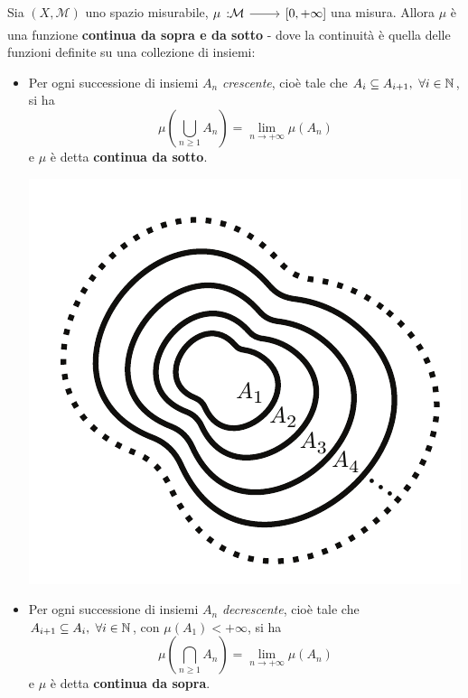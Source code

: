 \begin{property}
	Sia $\left(X,\mathcal{M}\right)$ uno spazio misurabile, $\funz{\mu}{\mathcal{M}}{\left[0,+\infty\right]}$ una misura. Allora $\mu$ è una funzione \textbf{continua da sopra e da sotto} - dove la continuità è quella delle funzioni definite su una collezione di insiemi:
	\begin{itemize}
		\item Per ogni successione di insiemi $A_n$ \textit{crescente}, cioè tale che $A_i\subseteq A_{i+1},\ \forall i\in\mathbb{N}$, si ha
		\begin{equation}
			\mu\left(\bigcup_{n\geq 1}A_n\right)=\lim_{n\to+\infty}\mu\left(A_n\right)
		\end{equation}
		e $\mu$ è detta \textbf{continua da sotto}. 
	\begin{center}
		\includegraphics[trim=0cm 0cm 0cm 0cm, clip, scale=0.6]{images/misuracontinua1.pdf}
	\end{center}
	\item Per ogni successione di insiemi $A_n$ \textit{decrescente}, cioè tale che $A_{i+1}\subseteq A_i,\ \forall i\in\mathbb{N}$, con $\mu(A_1)<+\infty$, si ha
		\begin{equation}
			\mu\left(\bigcap_{n\geq 1}A_n\right)=\lim_{n\to+\infty}\mu\left(A_n\right)
		\end{equation}
	e $\mu$ è detta \textbf{continua da sopra}.

\end{itemize}
\end{property}
